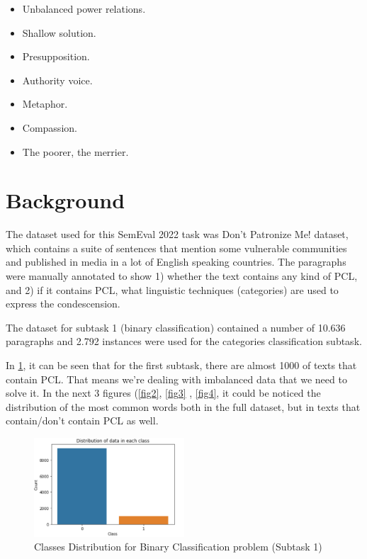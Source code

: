 \documentclass[11pt]{article}
\begin{document}
\begin{itemize}
\item Unbalanced power relations.

\item Shallow solution.

\item Presupposition.

\item Authority voice.

\item Metaphor.

\item Compassion.

\item The poorer, the merrier.
\end{itemize}

\section{Background}

The dataset used for this SemEval 2022 task was Don't Patronize Me! dataset,
which contains a suite of sentences that mention some vulnerable communities
and published in media in a lot of English speaking countries. The
paragraphs were manually annotated to show 1) whether the text contains any
kind of PCL, and 2) if it contains PCL, what linguistic techniques
(categories) are used to express the condescension.

The dataset for subtask 1 (binary classification) contained a number of
10.636 paragraphs and 2.792 instances were used for the categories
classification subtask.

In \ref{fig1}, it can be seen that for the first subtask, there are almost
1000 of texts that contain PCL. That means we're dealing with imbalanced
data that we need to solve it. In the next 3 figures (\ref{fig2}, \ref{fig3}%
, \ref{fig4}, it could be noticed the distribution of the most common words
both in the full dataset, but in texts that contain/don't contain PCL as
well.

\begin{figure}[h]
\centering
\includegraphics[width=0.5\textwidth]{DataDistribution.png}
\caption{Classes Distribution for Binary Classification problem (Subtask 1)}
\label{fig1}
\end{figure}
\end{document}

